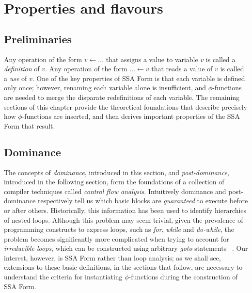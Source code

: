 \chapter{Properties and flavours }
\label{chap:properties-and-flavours}


\section{Preliminaries}

Any operation of the form $v \leftarrow \ldots$ that assigns a value
to variable $v$ is called a \emph{definition} of $v$. Any operation
of the form $\ldots \leftarrow v$ that reads a value of $v$ is called
a \emph{use} of $v$. One of the key properties of SSA Form is that
each variable is defined only once; however, renaming each variable 
alone is insufficient, and $\phi$-functions are needed to merge
the disparate redefinitions of each variable. The remaining 
sections of this chapter provide the theoretical foundations that
describe precisely how $\phi$-functions are inserted, and then
derives important properties of the SSA Form that result. 

\section{Dominance}


The concepts of \emph{dominance}, introduced in this section, and 
\emph{post-dominance}, introduced in the following section, form the
foundations of a collection of compiler techniques called 
\emph{control flow analysis}. Intuitively dominance and post-dominance
respectively tell us which basic blocks are \emph{guaranteed} to
execute before or after others. Historically, this information has
been used to identify hierarchies of nested loops. Although this
problem may seem trivial, given the prevalence of programming 
constructs to express loops, such as \emph{for}, \emph{while} and
\emph{do-while}, the problem becomes significantly more complicated
when trying to account for \emph{irreducible loops}, which can be
constructed using arbitrary \emph{goto} statements
~\cite{RamlingamSep02}. Our interest, however, is SSA Form
rather than loop analysis; as we shall see, extensions to these
basic definitions, in the sections that follow, are necessary to
understand the criteria for instantiating $\phi$-functions 
during the construction of SSA Form. 

